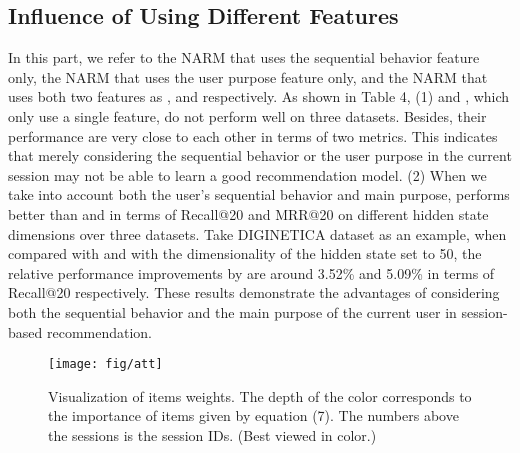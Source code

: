 \documentclass[sigconf]{acmart}
\begin{document}
\subsection{Influence of Using Different Features}
In this part, we refer to the NARM that uses the sequential behavior feature only, the NARM that uses the user purpose feature only, and the NARM that uses both two features as ,  and  respectively. As shown in Table 4, (1)  and , which only use a single feature, do not perform well on three datasets. Besides, their performance are very close to each other in terms of two metrics. This indicates that merely considering the sequential behavior or the user purpose in the current session may not be able to learn a good recommendation model. (2) When we take into account both the user's sequential behavior and main purpose,  performs better than  and  in terms of Recall@20 and MRR@20 on different hidden state dimensions over three datasets. Take DIGINETICA dataset as an example, when compared with  and  with the dimensionality of the hidden state set to 50, the relative performance improvements by  are around 3.52\% and 5.09\% in terms of Recall@20 respectively. These results demonstrate the advantages of considering both the sequential behavior and the main purpose of the current user in session-based recommendation.
  
    \begin{figure*}
  	    \centering
  	    \texttt{[image: fig/att]}
  	    \caption{Visualization of items weights. The depth of the color corresponds to the importance of items given by equation (7). The numbers above the sessions is the session IDs. (Best viewed in color.)}
    \end{figure*}
\end{document}
